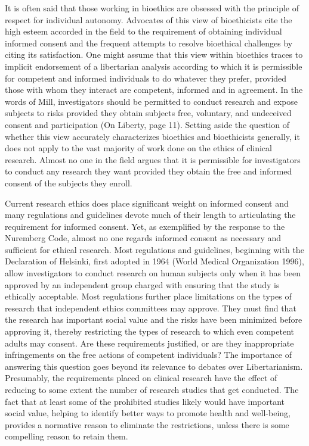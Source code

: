 \documentclass[12p]{article}
\begin{document}
 It is often said that those working in bioethics are obsessed with the principle of respect for individual autonomy. Advocates of this view of bioethicists cite the high esteem accorded in the field to the requirement of obtaining individual informed consent and the frequent attempts to resolve bioethical challenges by citing its satisfaction. One might assume that this view within bioethics traces to implicit endorsement of a libertarian analysis according to which it is permissible for competent and informed individuals to do whatever they prefer, provided those with whom they interact are competent, informed and in agreement. In the words of Mill, investigators should be permitted to conduct research and expose subjects to risks provided they obtain subjects free, voluntary, and undeceived consent and participation (On Liberty, page 11). Setting aside the question of whether this view accurately characterizes bioethics and bioethicists generally, it does not apply to the vast majority of work done on the ethics of clinical research. Almost no one in the field argues that it is permissible for investigators to conduct any research they want provided they obtain the free and informed consent of the subjects they enroll.

Current research ethics does place significant weight on informed consent and many regulations and guidelines devote much of their length to articulating the requirement for informed consent. Yet, as exemplified by the response to the Nuremberg Code, almost no one regards informed consent as necessary and sufficient for ethical research. Most regulations and guidelines, beginning with the Declaration of Helsinki, first adopted in 1964 (World Medical Organization 1996), allow investigators to conduct research on human subjects only when it has been approved by an independent group charged with ensuring that the study is ethically acceptable. Most regulations further place limitations on the types of research that independent ethics committees may approve. They must find that the research has important social value and the risks have been minimized before approving it, thereby restricting the types of research to which even competent adults may consent. Are these requirements justified, or are they inappropriate infringements on the free actions of competent individuals? The importance of answering this question goes beyond its relevance to debates over Libertarianism. Presumably, the requirements placed on clinical research have the effect of reducing to some extent the number of research studies that get conducted. The fact that at least some of the prohibited studies likely would have important social value, helping to identify better ways to promote health and well-being, provides a normative reason to eliminate the restrictions, unless there is some compelling reason to retain them.
\end{document}

